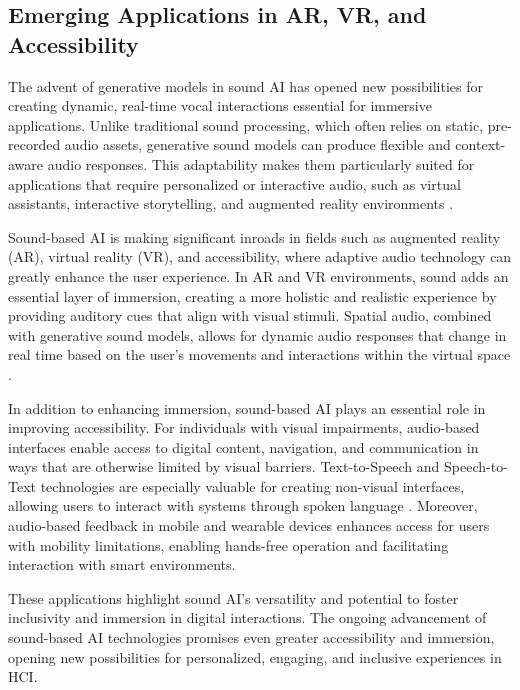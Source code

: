 \subsection{Emerging Applications in AR, VR, and Accessibility}

The advent of generative models in sound AI has opened new possibilities for creating dynamic, real-time vocal interactions essential for immersive applications. Unlike traditional sound processing, which often relies on static, pre-recorded audio assets, generative sound models can produce flexible and context-aware audio responses. This adaptability makes them particularly suited for applications that require personalized or interactive audio, such as virtual assistants, interactive storytelling, and augmented reality environments \cite{1386017}\cite{van2016wavenet}.

Sound-based AI is making significant inroads in fields such as augmented reality (AR), virtual reality (VR), and accessibility, where adaptive audio technology can greatly enhance the user experience. In AR and VR environments, sound adds an essential layer of immersion, creating a more holistic and realistic experience by providing auditory cues that align with visual stimuli. Spatial audio, combined with generative sound models, allows for dynamic audio responses that change in real time based on the user’s movements and interactions within the virtual space \cite{su2024sonifyar}.

In addition to enhancing immersion, sound-based AI plays an essential role in improving accessibility. For individuals with visual impairments, audio-based interfaces enable access to digital content, navigation, and communication in ways that are otherwise limited by visual barriers. Text-to-Speech and Speech-to-Text technologies are especially valuable for creating non-visual interfaces, allowing users to interact with systems through spoken language \cite{wald2005enhancing}. Moreover, audio-based feedback in mobile and wearable devices enhances access for users with mobility limitations, enabling hands-free operation and facilitating interaction with smart environments.

These applications highlight sound AI’s versatility and potential to foster inclusivity and immersion in digital interactions. The ongoing advancement of sound-based AI technologies promises even greater accessibility and immersion, opening new possibilities for personalized, engaging, and inclusive experiences in HCI.

